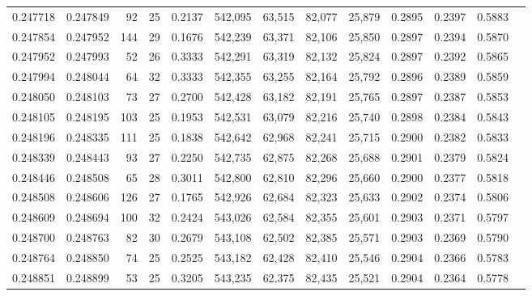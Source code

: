 \begin{tabular}{rrrrrrrrrrrrr}
0.247718 & 0.247849 &  92 &  25 &                                     0.2137 & 542,095 &  63,515 &  82,077 &  25,879 & 0.2895 & 0.2397 & 0.5883 \\
0.247854 & 0.247952 & 144 &  29 &                                     0.1676 & 542,239 &  63,371 &  82,106 &  25,850 & 0.2897 & 0.2394 & 0.5870 \\
0.247952 & 0.247993 &  52 &  26 &                                     0.3333 & 542,291 &  63,319 &  82,132 &  25,824 & 0.2897 & 0.2392 & 0.5865 \\
0.247994 & 0.248044 &  64 &  32 &                                     0.3333 & 542,355 &  63,255 &  82,164 &  25,792 & 0.2896 & 0.2389 & 0.5859 \\
0.248050 & 0.248103 &  73 &  27 &                                     0.2700 & 542,428 &  63,182 &  82,191 &  25,765 & 0.2897 & 0.2387 & 0.5853 \\
0.248105 & 0.248195 & 103 &  25 &                                     0.1953 & 542,531 &  63,079 &  82,216 &  25,740 & 0.2898 & 0.2384 & 0.5843 \\
0.248196 & 0.248335 & 111 &  25 &                                     0.1838 & 542,642 &  62,968 &  82,241 &  25,715 & 0.2900 & 0.2382 & 0.5833 \\
0.248339 & 0.248443 &  93 &  27 &                                     0.2250 & 542,735 &  62,875 &  82,268 &  25,688 & 0.2901 & 0.2379 & 0.5824 \\
0.248446 & 0.248508 &  65 &  28 &                                     0.3011 & 542,800 &  62,810 &  82,296 &  25,660 & 0.2900 & 0.2377 & 0.5818 \\
0.248508 & 0.248606 & 126 &  27 &                                     0.1765 & 542,926 &  62,684 &  82,323 &  25,633 & 0.2902 & 0.2374 & 0.5806 \\
0.248609 & 0.248694 & 100 &  32 &                                     0.2424 & 543,026 &  62,584 &  82,355 &  25,601 & 0.2903 & 0.2371 & 0.5797 \\
0.248700 & 0.248763 &  82 &  30 &                                     0.2679 & 543,108 &  62,502 &  82,385 &  25,571 & 0.2903 & 0.2369 & 0.5790 \\
0.248764 & 0.248850 &  74 &  25 &                                     0.2525 & 543,182 &  62,428 &  82,410 &  25,546 & 0.2904 & 0.2366 & 0.5783 \\
0.248851 & 0.248899 &  53 &  25 &                                     0.3205 & 543,235 &  62,375 &  82,435 &  25,521 & 0.2904 & 0.2364 & 0.5778 \\

\end{tabular}
